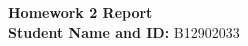 \documentclass[12pt, a4paper]{article}
\theoremstyle{mystyle}
\begin{document}
\author{ShangJhe Li}
\cfoot{\thepage}
\rfoot{\rightmark}

\pagestyle{fancy}
\begin{center}
  {\Huge \bf Homework 2 Report}\\[8pt]
  \textbf{Student Name and ID:} B12902033 \theauthor\\
  
\end{center}





\end{document}
